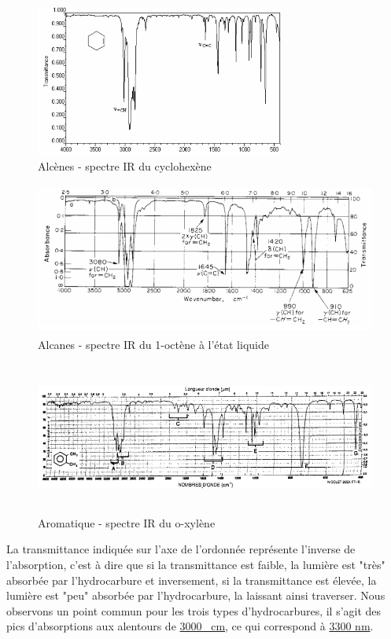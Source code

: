 \begin{figure}[H]
    \centering
    \includegraphics[height=5cm,angle=90]{assets/figures/alcenes1.png}
    \caption{Alcènes - spectre IR du cyclohexène \cite{Hydrocarbures}}
\end{figure}

\begin{figure}[H]
    \centering
    \includegraphics[height=5cm,angle=90]{assets/figures/alcenes2.png}
    \caption{Alcanes - spectre IR du  1-octène à l’état liquide\cite{Hydrocarbures}}
\end{figure}

\begin{figure}[H]
    \centering
    \includegraphics[height=5cm,angle=90]{assets/figures/aromatique.png}
    \caption{Aromatique - spectre IR du o-xylène \cite{Hydrocarbures}}
\end{figure}

\newpage
La transmittance indiquée sur l'axe de l'ordonnée représente l'inverse de l'absorption, c'est à dire que si la transmittance est faible, la lumière
est "très" absorbée par l'hydrocarbure et inversement, si la transmittance est élevée, la lumière est "peu" absorbée par l'hydrocarbure, la laissant ainsi traverser.
Nous observons un point commun pour les trois types d'hydrocarbures, il s'agit des pics d'absorptions aux alentours de \underline{3000 \si{\per\centi\metre}}, ce qui correspond à \underline{3300 \si{\nano\metre}}.

